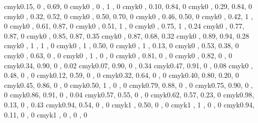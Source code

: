 \definecolor{greenyellow}   {cmyk}{0.15, 0   , 0.69, 0   }
\definecolor{yellow}        {cmyk}{0   , 0   , 1   , 0   }
\definecolor{goldenrod}     {cmyk}{0   , 0.10, 0.84, 0   }
\definecolor{dandelion}     {cmyk}{0   , 0.29, 0.84, 0   }
\definecolor{apricot}       {cmyk}{0   , 0.32, 0.52, 0   }
\definecolor{peach}         {cmyk}{0   , 0.50, 0.70, 0   }
\definecolor{melon}         {cmyk}{0   , 0.46, 0.50, 0   }
\definecolor{yelloworange}  {cmyk}{0   , 0.42, 1   , 0   }
\definecolor{orange}        {cmyk}{0   , 0.61, 0.87, 0   }
\definecolor{burntorange}   {cmyk}{0   , 0.51, 1   , 0   }
\definecolor{bittersweet}   {cmyk}{0   , 0.75, 1   , 0.24}
\definecolor{redorange}     {cmyk}{0   , 0.77, 0.87, 0   }
\definecolor{mahogany}      {cmyk}{0   , 0.85, 0.87, 0.35}
\definecolor{maroon}        {cmyk}{0   , 0.87, 0.68, 0.32}
\definecolor{brickred}      {cmyk}{0   , 0.89, 0.94, 0.28}
\definecolor{red}           {cmyk}{0   , 1   , 1   , 0   }
\definecolor{orangered}     {cmyk}{0   , 1   , 0.50, 0   }
\definecolor{rubinered}     {cmyk}{0   , 1   , 0.13, 0   }
\definecolor{salmon}        {cmyk}{0   , 0.53, 0.38, 0   }
\definecolor{carnationpink} {cmyk}{0   , 0.63, 0   , 0   }
\definecolor{magenta}       {cmyk}{0   , 1   , 0   , 0   }
\definecolor{violetred}     {cmyk}{0   , 0.81, 0   , 0   }
\definecolor{rhodamine}     {cmyk}{0   , 0.82, 0   , 0   }
\definecolor{mulberry}      {cmyk}{0.34, 0.90, 0   , 0.02}
\definecolor{redviolet}     {cmyk}{0.07, 0.90, 0   , 0.34}
\definecolor{fuchsia}       {cmyk}{0.47, 0.91, 0   , 0.08}
\definecolor{lavender}      {cmyk}{0   , 0.48, 0   , 0   }
\definecolor{thistle}       {cmyk}{0.12, 0.59, 0   , 0   }
\definecolor{orchid}        {cmyk}{0.32, 0.64, 0   , 0   }
\definecolor{darkorchid}    {cmyk}{0.40, 0.80, 0.20, 0   }
\definecolor{purple}        {cmyk}{0.45, 0.86, 0   , 0   }
\definecolor{plum}          {cmyk}{0.50, 1   , 0   , 0   }
\definecolor{violet}        {cmyk}{0.79, 0.88, 0   , 0   }
\definecolor{royalpurple}   {cmyk}{0.75, 0.90, 0   , 0   }
\definecolor{blueviolet}    {cmyk}{0.86, 0.91, 0   , 0.04}
\definecolor{periwinkle}    {cmyk}{0.57, 0.55, 0   , 0   }
\definecolor{cadetblue}     {cmyk}{0.62, 0.57, 0.23, 0   }
\definecolor{midnightblue}  {cmyk}{0.98, 0.13, 0   , 0.43}
\definecolor{navyblue}      {cmyk}{0.94, 0.54, 0   , 0   }
\definecolor{royalblue}     {cmyk}{1   , 0.50, 0   , 0   }
\definecolor{blue}          {cmyk}{1   , 1   , 0   , 0   }
\definecolor{cerulean}      {cmyk}{0.94, 0.11, 0   , 0   }
\definecolor{cyan}          {cmyk}{1   , 0   , 0   , 0   }
